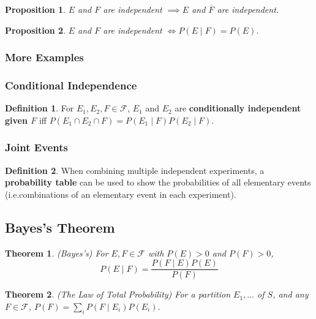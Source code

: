 \documentclass[12pt]{article}
\newtheorem{thm}{Theorem}[section]
\newtheorem*{prop*}{Proposition}
\theoremstyle{definition}
\newtheorem*{defn*}{Definition}
\newcommand{\F}{\mathcal{F}}
\begin{document}
\begin{prop*}
  $E$ and $F$ are independent $\implies E$ and $\overline{F}$ are independent.
\end{prop*}

\begin{prop*}
  $E$ and $F$ are independent $\iff P(E \mid F) = P(E)$.
\end{prop*}

\subsubsection{More Examples}

\subsubsection{Conditional Independence}

\begin{defn*}
  For $E_1, E_2, F \in \F$, $E_1$ and $E_2$ are \textbf{conditionally independent given $F$} iff $P(E_1 \cap E_2 \cap F) = P(E_1 \mid F)P(E_2 \mid F)$.
\end{defn*}

\subsubsection{Joint Events}

\begin{defn*}
  When combining multiple independent experiments, a \textbf{probability table} can be used to show the probabilities of all elementary events (i.e.\@ combinations of an elementary event in each experiment).
\end{defn*}

\subsection{Bayes's Theorem}


\begin{thm}
  (Bayes's)
  For $E, F \in \F$ with $P(E) > 0$ and $P(F) > 0$,
  $$P(E \mid F) = \frac{P(F \mid E)P(E)}{P(F)}$$
\end{thm}

\begin{thm}
  (The Law of Total Probability)
  For a partition $E_1, \ldots$ of $S$, and any $F \in \F$, $P(F) = \sum_iP(F \mid E_i)P(E_i)$.
\end{thm}
\end{document}
